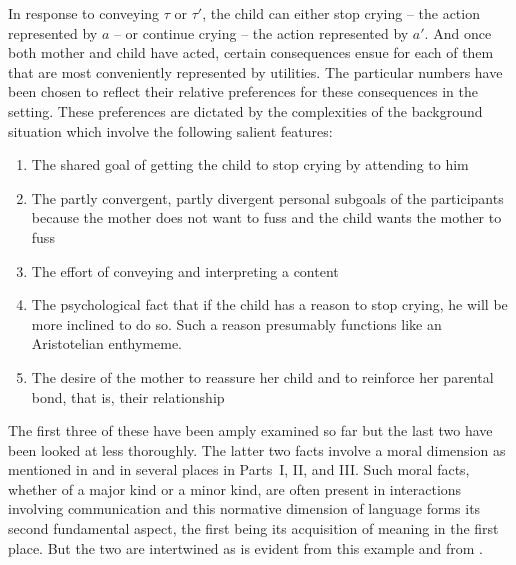 In response to conveying $\tau$ or $\tau'$, the child can either stop crying -- the action represented by $a$ -- or continue crying -- the action represented by $a'$. And once both mother and child have acted, certain consequences ensue for each of them that are most conveniently represented by utilities. The particular numbers have been chosen to reflect their relative preferences for these consequences in the setting. These preferences are dictated by the complexities of the background situation which involve the following salient features:

\begin{enumerate}

\item The shared goal of getting the child to stop crying by attending to him
\item The partly convergent, partly divergent personal subgoals of the participants because the mother does not want to fuss and the child wants the mother to fuss
\item The effort of conveying and interpreting a content
\item The psychological fact that if the child has a reason to stop crying, he will be more inclined to do so. Such a reason presumably functions like an Aristotelian enthymeme.
\item The desire of the mother to reassure her child and to reinforce her parental bond, that is, their relationship

\end{enumerate}

The first three of these have been amply examined so far but the last two have been looked at less thoroughly. The latter two facts involve a moral dimension as mentioned in \citet{taylor:halpp} and in several places in Parts~\textrm{I}, \textrm{II}, and \textrm{III}. Such moral facts, whether of a major kind or a minor kind, are often present in interactions involving communication and this normative dimension of language forms its second fundamental aspect, the first being its acquisition of meaning in the first place. But the two are intertwined as is evident from this example and from .

